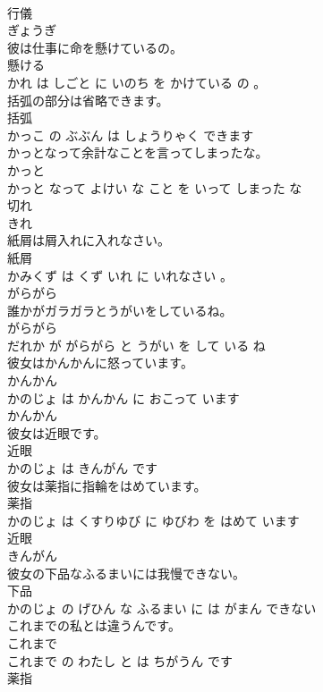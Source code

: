\documentclass[8pt]{extreport}
\begin{document}
\begin{CJK}{UTF8}{min}
\\	行儀	
\\	ぎょうぎ			
\\	彼は仕事に命を懸けているの。	
\\	懸ける 
\\	かれ は しごと に いのち を かけている の 。			
\\	括弧の部分は省略できます。	
\\	括弧 
\\	かっこ の ぶぶん は しょうりゃく できます			
\\	かっとなって余計なことを言ってしまったな。	
\\	かっと 
\\	かっと なって よけい な こと を いって しまった な			
\\	切れ	
\\	きれ			
\\	紙屑は屑入れに入れなさい。	
\\	紙屑 
\\	かみくず は くず いれ に いれなさい 。			
\\	がらがら	
\\	誰かがガラガラとうがいをしているね。	
\\	がらがら 
\\	だれか が がらがら と うがい を して いる ね			
\\	彼女はかんかんに怒っています。	
\\	かんかん 
\\	かのじょ は かんかん に おこって います			
\\	かんかん	
\\	彼女は近眼です。	
\\	近眼 
\\	かのじょ は きんがん です			
\\	彼女は薬指に指輪をはめています。	
\\	薬指 
\\	かのじょ は くすりゆび に ゆびわ を はめて います			
\\	近眼	
\\	きんがん			
\\	彼女の下品なふるまいには我慢できない。	
\\	下品 
\\	かのじょ の げひん な ふるまい に は がまん できない			
\\	これまでの私とは違うんです。	
\\	これまで 
\\	これまで の わたし と は ちがうん です			
\\	薬指	

\end{CJK}
\end{document}

